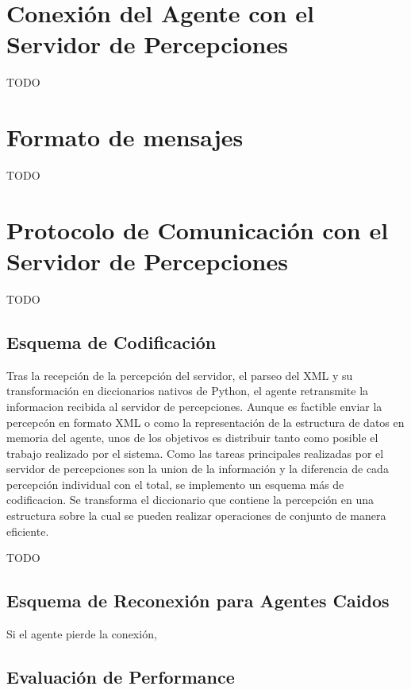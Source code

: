 \section[Conexión con el Percept Server]
 {Conexión del Agente con el Servidor de Percepciones}
 \label{sec:conexion}

 TODO

\section{Formato de mensajes}
 \label{sec:formato_mensajes}

 TODO

\section[Protocolo del Percept Server]
 {Protocolo de Comunicación con el Servidor de Percepciones}
 \label{sec:protocolo_perceptserver}

 TODO

\subsection{Esquema de Codificación}
 \label{sub:esquema_codificacion}

 Tras la recepción de la percepción del servidor, el parseo del XML y
 su transformación en diccionarios nativos de Python, el agente
 retransmite la informacion recibida al servidor de percepciones.
 Aunque es factible enviar la percepcón en formato XML o como la
 representación de la estructura de datos en memoria del agente, unos
 de los objetivos es distribuir tanto como posible el trabajo realizado
 por el sistema.
 Como las tareas principales realizadas por el servidor de percepciones 
 son la union de la información y la diferencia de cada percepción 
 individual con el total, se implemento un esquema más de codificacion. 
 Se transforma el diccionario que contiene la percepción en una 
 estructura sobre la cual se pueden realizar operaciones de conjunto de 
 manera eficiente. 

 TODO

\subsection{Esquema de Reconexión para Agentes Caidos}
 \label{sub:esquema_reconexion}
 
 Si el agente pierde la conexión, 
 
\subsection{Evaluación de Performance}
 \label{sub:evaluacion_performance}
